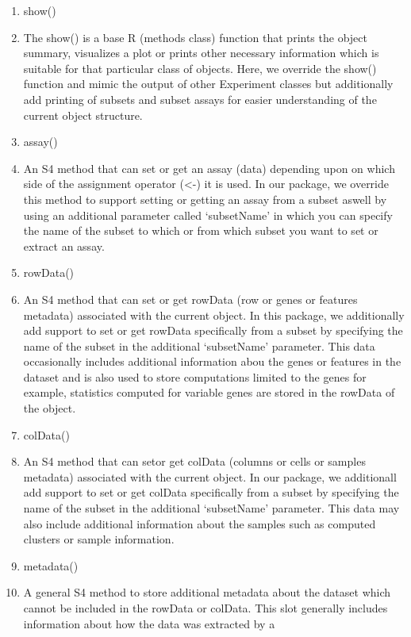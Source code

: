 \documentclass[
]{article}
\providecommand{\tightlist}{%
  \setlength{\itemsep}{0pt}\setlength{\parskip}{0pt}}
\begin{document}
\begin{enumerate}
\def\labelenumi{\alph{enumi}.}
\tightlist
\item
  show()
\item
  The show() is a base R (methods class) function that prints the object
  summary, visualizes a plot or prints other necessary information which
  is suitable for that particular class of objects. Here, we override
  the show() function and mimic the output of other Experiment classes
  but additionally add printing of subsets and subset assays for easier
  understanding of the current object structure.
\item
  assay()
\item
  An S4 method that can set or get an assay (data) depending upon on
  which side of the assignment operator (\textless-) it is used. In our
  package, we override this method to support setting or getting an
  assay from a subset aswell by using an additional parameter called
  `subsetName' in which you can specify the name of the subset to which
  or from which subset you want to set or extract an assay.
\item
  rowData()
\item
  An S4 method that can set or get rowData (row or genes or features
  metadata) associated with the current object. In this package, we
  additionally add support to set or get rowData specifically from a
  subset by specifying the name of the subset in the additional
  `subsetName' parameter. This data occasionally includes additional
  information abou the genes or features in the dataset and is also used
  to store computations limited to the genes for example, statistics
  computed for variable genes are stored in the rowData of the object.
\item
  colData()
\item
  An S4 method that can setor get colData (columns or cells or samples
  metadata) associated with the current object. In our package, we
  additionall add support to set or get colData specifically from a
  subset by specifying the name of the subset in the additional
  `subsetName' parameter. This data may also include additional
  information about the samples such as computed clusters or sample
  information.
\item
  metadata()
\item
  A general S4 method to store additional metadata about the dataset
  which cannot be included in the rowData or colData. This slot
  generally includes information about how the data was extracted by a

\end{enumerate}
\end{document}
